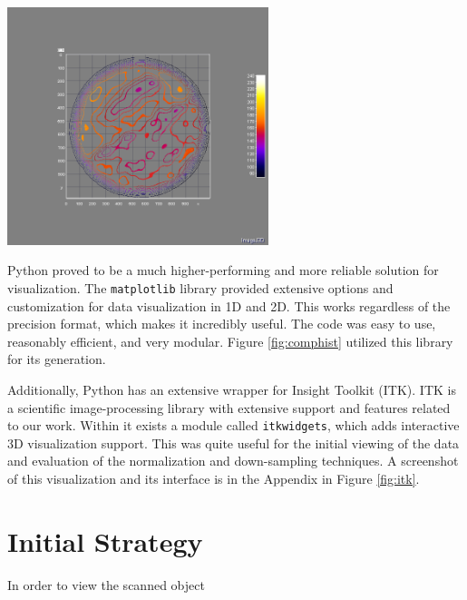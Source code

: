 \documentclass[11pt, letterpaper, notitlepage]{article}
\newenvironment{Figure}
  {\par\medskip\noindent\minipage{\linewidth}}
  {\endminipage\par\medskip}
\begin{document}
\begin{multicols}{2}
\begin{Figure}
  \centering
  \includegraphics[width=3in]{images/Norm_Slice_Isoline_Plot_Top-Down.png}
  \label{fig:aij3disoline}
\end{Figure}

Python proved to be a much higher-performing and more reliable solution for visualization. The \verb|matplotlib|\cite{hunter_matplotlib_2007} library provided extensive options and customization for data visualization in 1D and 2D. This works regardless of the precision format, which makes it incredibly useful. The code was easy to use, reasonably efficient, and very modular. Figure \ref{fig:comphist} utilized this library for its generation.

Additionally, Python has an extensive wrapper for Insight Toolkit (ITK)\cite{mccormick_itk_2014}. ITK is a scientific image-processing library with extensive support and features related to our work. Within it exists a module called \verb|itkwidgets|, which adds interactive 3D visualization support. This was quite useful for the initial viewing of the data and evaluation of the normalization and down-sampling techniques. A screenshot of this visualization and its interface is in the Appendix in Figure \ref{fig:itk}.

\section{Initial Strategy}
In order to view the scanned object 


\end{multicols}
\end{document}
